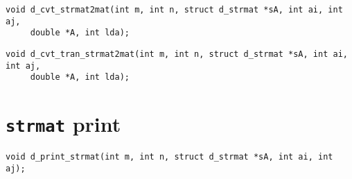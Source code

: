 \documentclass[a4paper]{report}
\begin{document}
\begin{verbatim}
void d_cvt_strmat2mat(int m, int n, struct d_strmat *sA, int ai, int aj, 
     double *A, int lda);
\end{verbatim}

\begin{verbatim}
void d_cvt_tran_strmat2mat(int m, int n, struct d_strmat *sA, int ai, int aj, 
     double *A, int lda);
\end{verbatim}



\section{{\tt strmat} print}

\begin{verbatim}
void d_print_strmat(int m, int n, struct d_strmat *sA, int ai, int aj);
\end{verbatim}
\end{document}
